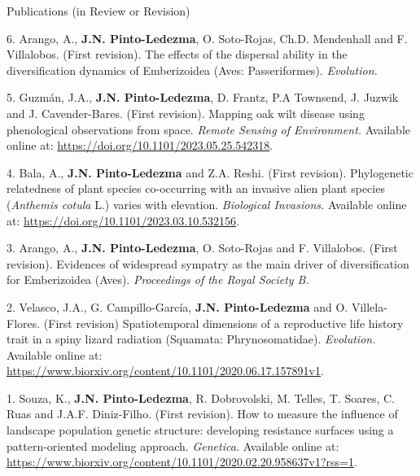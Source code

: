 \documentclass{resume} %
\begin{document}

\begin{rSection}{Publications (in Review or Revision)} 

\normalfont 

{6.} {Arango, A.,} {\bf{J.N. Pinto-Ledezma}}, { O. Soto-Rojas, Ch.D. Mendenhall and F. Villalobos. (First revision). The effects of the dispersal ability in the diversification dynamics of Emberizoidea (Aves: Passeriformes).} {\em Evolution.}

{5.} {Guzmán, J.A.,} {\bf{J.N. Pinto-Ledezma}}, {D. Frantz, P.A Townsend, J. Juzwik and J. Cavender-Bares. (First revision). Mapping oak wilt disease using phenological observations from space.} {\em Remote Sensing of Environment.} {Available online at:} \url {https://doi.org/10.1101/2023.05.25.542318}.

{4.} {Bala, A.,} {\bf{J.N. Pinto-Ledezma\dag}} and {Z.A. Reshi\dag. (First revision). Phylogenetic relatedness of plant species co-occurring with an invasive alien plant species ({\em Anthemis cotula} L.) varies with elevation.} {\em Biological Invasions.} {Available online at:} \url {https://doi.org/10.1101/2023.03.10.532156}.

{3.} {Arango, A.,} {\bf{J.N. Pinto-Ledezma}}, { O. Soto-Rojas and F. Villalobos. (First revision). Evidences of widespread sympatry as the main driver of diversification for Emberizoidea (Aves).} {\em Proceedings of the Royal Society B.}

{2.} {Velasco, J.A., G. Campillo-García,} {\bf{J.N. Pinto-Ledezma}} {and O. Villela-Flores. (First revision) Spatiotemporal dimensions of a reproductive life history trait in a spiny lizard radiation (Squamata: Phrynosomatidae).} {\em Evolution.} {Available online at:} \url {https://www.biorxiv.org/content/10.1101/2020.06.17.157891v1}.

{1.} {Souza, K.,} {\bf{J.N. Pinto-Ledezma}}, {R. Dobrovolski, M. Telles, T. Soares, C. Ruas and J.A.F. Diniz-Filho. (First revision). How to measure the influence of landscape population genetic structure: developing resistance surfaces using a pattern-oriented modeling approach.} {\em Genetica.} {Available online at:} \url {https://www.biorxiv.org/content/10.1101/2020.02.20.958637v1?rss=1}.

\end{rSection}
\end{document}
